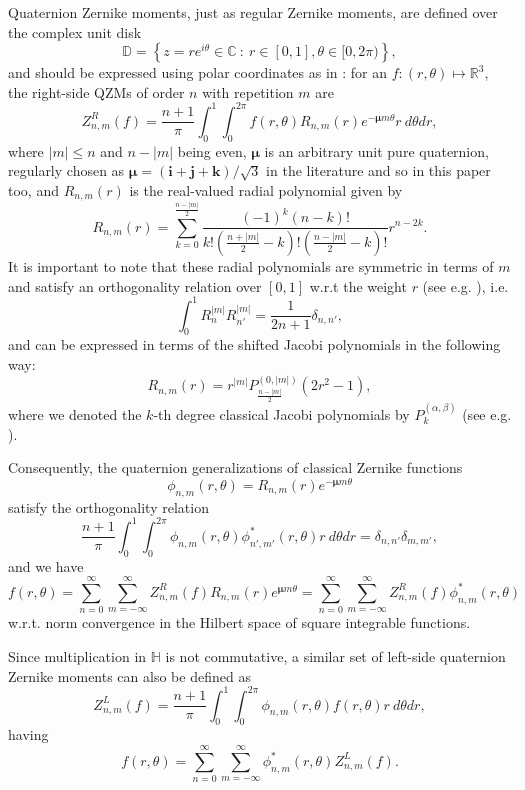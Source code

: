 \documentclass[12pt]{article}
\newcommand{\R}{\mathbb{R}}
\newcommand{\C}{\mathbb{C}}
\newcommand{\Hq}{\mathbb{H}}
\newcommand{\D}{\mathbb{D}}
\newcommand{\qi}{\textbf{i}}
\newcommand{\qj}{\textbf{j}}
\newcommand{\qk}{\textbf{k}}
\newcommand{\qmu}{\boldsymbol{\mu}}
\begin{document}
Quaternion Zernike moments, just as regular Zernike moments, are defined over the complex unit disk
\[
	\D = \left\{ z = re^{i\theta}\in\C \ :\ r\in[0,1],\theta\in[0,2\pi)\right\},
\]
and should be expressed using polar coordinates as in \cite{ChenOriginal}: for an $f: (r,\theta)\mapsto\R^3$, the right-side QZMs of order $n$ with repetition $m$ are
\begin{equation}\label{QZRM}
	Z_{n,m}^R (f) = \frac{n+1}{\pi} \int_0^1 \int_0^{2\pi} f(r,\theta) R_{n,m}(r) e^{-\qmu m\theta} r \ d\theta dr,
\end{equation}
where $|m|\leq n$ and $n-|m|$ being even, $\qmu$ is an arbitrary unit pure quaternion, regularly chosen as $\qmu = (\qi+\qj+\qk)/\sqrt{3}$ in the literature and so in this paper too, and $R_{n,m}(r)$ is the real-valued radial polynomial given by
\[
	R_{n,m}(r) = \sum_{k=0}^{\frac{n - |m|}{2}}\frac{(-1)^k (n - k)!}{k!\left(\frac{n + |m|}{2} - k\right)!\left(\frac{n - |m|}{2} - k\right)!}r^{n-2k}.
\]
It is important to note that these radial polynomials are symmetric in terms of $m$ and satisfy an orthogonality relation over $[0,1]$ w.r.t the weight $r$ (see e.g. \cite{PapSchipp}), i.e.
\[
	\int_0^1 R_n^{|m|} R_{n'}^{|m|}  = \frac{1}{2n+1} \delta_{n,n'},
\]
and can be expressed in terms of the shifted Jacobi polynomials in the following way:
\[
	R_{n,m}(r) = r^{|m|} P_{\frac{n - |m|}{2}}^{(0,|m|)}(2r^2-1),
\]
where we denoted the $k$-th degree classical Jacobi polynomials by $P_k^{(\alpha,\beta)}$ (see e.g. \cite{Szego}).

Consequently, the quaternion generalizations of classical Zernike functions
\[
	\phi_{n,m}(r,\theta) = R_{n,m}(r) e^{-\qmu m\theta}
\]
satisfy the orthogonality relation
\begin{equation}\label{QZortho}
	\frac{n+1}{\pi} \int_0^1 \int_0^{2\pi} \phi_{n,m}(r,\theta) \phi^*_{n',m'}(r,\theta) r \ d\theta dr = \delta_{n,n'}\delta_{m,m'},
\end{equation}
and we have
\[
	f(r,\theta) = \sum_{n=0}^{\infty}\sum_{m=-\infty}^{\infty} Z_{n,m}^R(f) R_{n,m}(r)e^{\qmu m\theta} =
		\sum_{n=0}^{\infty}\sum_{m=-\infty}^{\infty} Z_{n,m}^R(f) \phi^*_{n,m}(r,\theta)
\]
w.r.t. norm convergence in the Hilbert space of square integrable functions.

Since multiplication in $\Hq$ is not commutative, a similar set of left-side quaternion Zernike moments can also be defined as
\begin{equation}\label{QZLM}
	Z_{n,m}^L(f) = \frac{n + 1}{\pi}\int_0^1\int_0^{2\pi} \phi_{n,m}(r,\theta) f(r,\theta)r \ d\theta dr,
\end{equation}
having
\[
	f(r,\theta) = \sum_{n=0}^{\infty}\sum_{m=-\infty}^{\infty} \phi^*_{n,m}(r,\theta) Z_{n,m}^L(f).
\]
\end{document}
